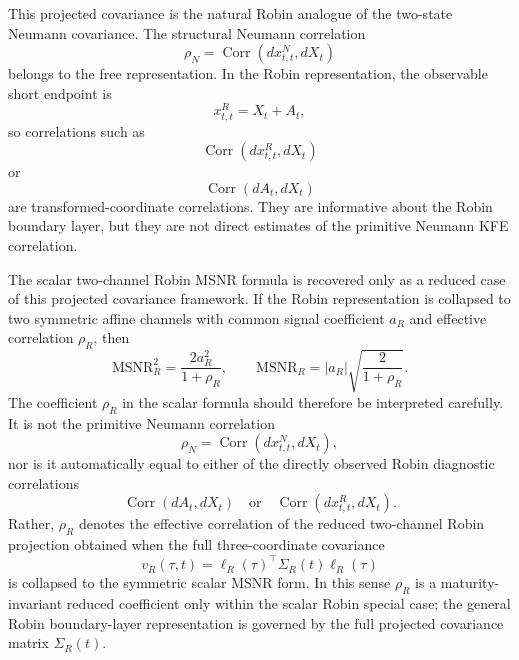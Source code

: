 \documentclass[11pt]{article}
\numberwithin{equation}{section}
\begin{document}
This projected covariance is the natural Robin analogue of the two-state Neumann covariance. The structural Neumann correlation
\begin{equation}
\label{eq:rhoN-free-correlation}
        \rho_N=\operatorname{Corr}(dx^N_{t,t},dX_t)
\end{equation}
belongs to the free representation. In the Robin representation, the observable short endpoint is
\begin{equation}
        x^R_{t,t}=X_t+A_t,
\end{equation}
so correlations such as
\begin{equation}
        \operatorname{Corr}(dx^R_{t,t},dX_t)
\end{equation}
or
\begin{equation}
        \operatorname{Corr}(dA_t,dX_t)
\end{equation}
are transformed-coordinate correlations. They are informative about the Robin boundary layer, but they are not direct estimates of the primitive Neumann KFE correlation.

The scalar two-channel Robin MSNR formula is recovered only as a reduced case of this projected covariance framework. If the Robin representation is collapsed to two symmetric affine channels with common signal coefficient \(a_R\) and effective correlation \(\rho_R\), then
\begin{equation}
\label{eq:robin-msnr-reduced-recovered}
        \mathrm{MSNR}_{R}^{2}
        =
        \frac{2a_R^2}{1+\rho_R},
        \qquad
        \mathrm{MSNR}_{R}
        =
        |a_R|\sqrt{\frac{2}{1+\rho_R}}.
\end{equation}
The coefficient \(\rho_R\) in the scalar formula should therefore be interpreted
carefully.  It is not the primitive Neumann correlation
\[
        \rho_N=\operatorname{Corr}(dx^N_{t,t},dX_t),
\]
nor is it automatically equal to either of the directly observed Robin
diagnostic correlations
\[
        \operatorname{Corr}(dA_t,dX_t)
        \quad\text{or}\quad
        \operatorname{Corr}(dx^R_{t,t},dX_t).
\]
Rather, \(\rho_R\) denotes the effective correlation of the reduced
two-channel Robin projection obtained when the full three-coordinate
covariance
\[
        v_R(\tau,t)=\ell_R(\tau)^\top\Sigma_R(t)\ell_R(\tau)
\]
is collapsed to the symmetric scalar MSNR form.  In this sense \(\rho_R\)
is a maturity-invariant reduced coefficient only within the scalar Robin
special case; the general Robin boundary-layer representation is governed
by the full projected covariance matrix \(\Sigma_R(t)\).
\end{document}
